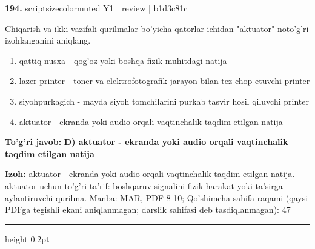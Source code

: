 \documentclass[10pt,a4paper]{article}
\begin{document}
{\bfseries\sffamily\color{ink} 194.} {scriptsizecolor{muted} Y1 | review | b1d3c81c}
\par
Chiqarish va ikki vazifali qurilmalar bo'yicha qatorlar ichidan "aktuator" noto'g'ri izohlanganini aniqlang.
\begin{enumerate}[label=\Alph*),leftmargin=9mm]
\item qattiq nusxa - qog'oz yoki boshqa fizik muhitdagi natija
\item lazer printer - toner va elektrofotografik jarayon bilan tez chop etuvchi printer
\item siyohpurkagich - mayda siyoh tomchilarini purkab tasvir hosil qiluvchi printer
\item aktuator - ekranda yoki audio orqali vaqtinchalik taqdim etilgan natija
\end{enumerate}
\begin{tcolorbox}[enhanced,breakable,colback=teal!4,colframe=teal!60!black,boxrule=0.45pt,arc=1.2mm,left=2.7mm,right=2.7mm,top=1.8mm,bottom=1.8mm,before skip=2mm,after skip=2mm]
{\bfseries\sffamily\color{teal}To'g'ri javob:} \textbf{D) aktuator - ekranda yoki audio orqali vaqtinchalik taqdim etilgan natija}
\par\smallskip
{\bfseries Izoh:} aktuator - ekranda yoki audio orqali vaqtinchalik taqdim etilgan natija. aktuator uchun to'g'ri ta'rif: boshqaruv signalini fizik harakat yoki ta'sirga aylantiruvchi qurilma. Manba: MAR, PDF 8-10; Qo'shimcha sahifa raqami (qaysi PDFga tegishli ekani aniqlanmagan; darslik sahifasi deb tasdiqlanmagan): 47
\end{tcolorbox}
\vspace{2mm}\hrule height 0.2pt\vspace{3mm}
\end{document}
